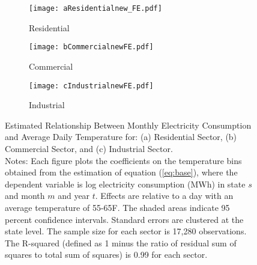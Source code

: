 \documentclass[11pt]{article}
\begin{document}
	\begin{figure}
	\centering
	
	\begin{subfigure}{0.49\textwidth}
		\centering
		\caption{Residential}
		\label{fig:residential1}
		\texttt{[image: aResidentialnew\_FE.pdf]}
	\end{subfigure} \hspace{0em}%
	\begin{subfigure}{0.49\textwidth}
		\centering
		\caption{Commercial}
		\label{fig:commercial1}
		\texttt{[image: bCommercialnewFE.pdf]}
	\end{subfigure}
	\begin{subfigure}{0.49\textwidth}
	\centering
	\caption{Industrial}
	\label{fig:industrial1}
	\texttt{[image: cIndustrialnewFE.pdf]}
	\end{subfigure}
	\caption{Estimated Relationship Between Monthly Electricity Consumption and Average Daily Temperature for: (a) Residential Sector, (b) Commercial Sector, and (c) Industrial Sector. \\ {\small Notes: Each figure plots the coefficients on the temperature bins obtained from the estimation of equation (\ref{eq:base}), where the dependent variable is log electricity consumption (MWh) in state $s$ and month $m$ and year $t$. Effects are relative to a day with an average temperature of 55-65\degree F. The shaded areas indicate 95 percent confidence intervals. Standard errors are clustered at the state level. The sample size for each sector is 17,280 observations. The R-squared (defined as 1 minus the ratio of residual sum of squares to total sum of squares) is 0.99 for each sector.}}
	\label{fig:electricity}
\end{figure}
\end{document}

